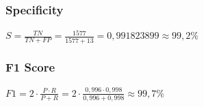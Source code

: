 \subsubsection{Specificity}
$ S = \frac{TN}{TN+FP} = \frac{1577}{1577+13} = 0,991823899 \approx 99,2\%$

\subsubsection{F1 Score}
$ F1 = 2 \cdot \frac{P \cdot R}{P + R} = 2 \cdot \frac{0,996 \cdot 0,998}{0,996 + 0,998} \approx 99,7\% $


